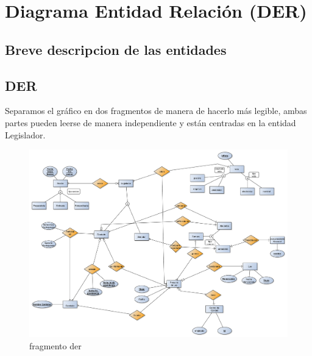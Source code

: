 \documentclass[10pt, a4paper]{article}
\begin{document}
\section{Diagrama Entidad Relaci\'on (DER)}

	\subsection{Breve descripcion de las entidades}

		

	\newpage
	\subsection{DER}

		Separamos el gr\'afico en dos fragmentos de manera de hacerlo m\'as legible, ambas partes pueden leerse de manera independiente y est\'an centradas en la entidad Legislador.
			
		\begin{figure}[ht]
		    \includegraphics[scale=.30]{./imagenes/DERParteDeAbajo.pdf}
		    \caption{fragmento der} 
		    \label{fig:derparte1}
		\end{figure}
				
\end{document}
